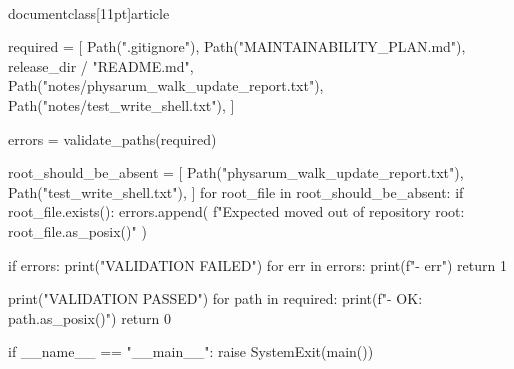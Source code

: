 \\documentclass[11pt]{article}
\begin{document}
\begin{CodeBlock}
    required = [
        Path(".gitignore"),
        Path("MAINTAINABILITY_PLAN.md"),
        release_dir / "README.md",
        Path("notes/physarum_walk_update_report.txt"),
        Path("notes/test_write_shell.txt"),
    ]

    errors = validate_paths(required)

    root_should_be_absent = [
        Path("physarum_walk_update_report.txt"),
        Path("test_write_shell.txt"),
    ]
    for root_file in root_should_be_absent:
        if root_file.exists():
            errors.append(
                f"Expected moved out of repository root: {root_file.as_posix()}"
            )

    if errors:
        print("VALIDATION FAILED")
        for err in errors:
            print(f"- {err}")
        return 1

    print("VALIDATION PASSED")
    for path in required:
        print(f"- OK: {path.as_posix()}")
    return 0


if __name__ == "__main__":
    raise SystemExit(main())

\end{CodeBlock}
\end{document}
